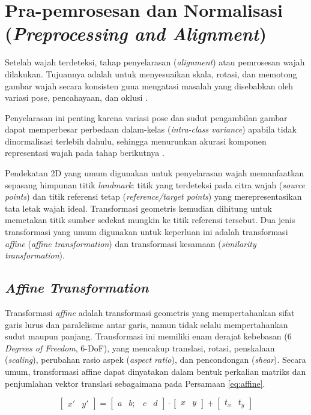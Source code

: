 \section{Pra-pemrosesan dan Normalisasi (\textit{Preprocessing and Alignment})}

Setelah wajah terdeteksi, tahap penyelarasan (\textit{alignment}) atau pemrosesan wajah dilakukan. Tujuannya adalah untuk menyesuaikan skala, rotasi, dan memotong gambar wajah secara konsisten guna mengatasi masalah yang disebabkan oleh variasi pose, pencahayaan, dan oklusi \autocite{Trigueros2018}.

Penyelarasan ini penting karena variasi pose dan sudut pengambilan gambar dapat memperbesar perbedaan dalam-kelas (\textit{intra-class variance}) apabila tidak dinormalisasi terlebih dahulu, sehingga menurunkan akurasi komponen representasi wajah pada tahap berikutnya \autocite{wang2021deep}.

Pendekatan 2D yang umum digunakan untuk penyelarasan wajah memanfaatkan sepasang himpunan titik \textit{landmark}: titik yang terdeteksi pada citra wajah (\textit{source points}) dan titik referensi tetap (\textit{reference/target points}) yang merepresentasikan tata letak wajah ideal. Transformasi geometris kemudian dihitung untuk memetakan titik sumber sedekat mungkin ke titik referensi tersebut. Dua jenis transformasi yang umum digunakan untuk keperluan ini adalah transformasi \textit{affine} (\textit{affine transformation}) dan transformasi kesamaan (\textit{similarity transformation}).

\subsection{\textit{Affine Transformation}}

Transformasi \textit{affine} adalah transformasi geometris yang mempertahankan sifat garis lurus dan paralelisme antar garis, namun tidak selalu mempertahankan sudut maupun panjang. Transformasi ini memiliki enam derajat kebebasan (6 \textit{Degrees of Freedom}, 6-DoF), yang mencakup translasi, rotasi, penskalaan (\textit{scaling}), perubahan rasio aspek (\textit{aspect ratio}), dan pencondongan (\textit{shear}). Secara umum, transformasi affine dapat dinyatakan dalam bentuk perkalian matriks dan penjumlahan vektor translasi sebagaimana pada Persamaan \ref{eq:affine}.

\begin{equation}
\begin{bmatrix} x' & y' \end{bmatrix} = \begin{bmatrix} a & b; & c & d \end{bmatrix} \cdot \begin{bmatrix} x & y \end{bmatrix} + \begin{bmatrix} t_x & t_y \end{bmatrix}
\label{eq:affine}
\end{equation}


